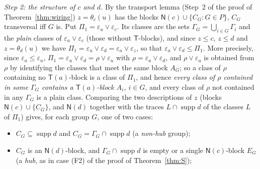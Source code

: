 \documentclass[11pt]{amsart}
\theoremstyle{definition}
\newcommand{\supp}{\operatorname{supp}}
\newcommand{\T}{\mathsf{T}}
\newcommand{\N}{\mathsf{N}}
\begin{document}
\smallskip
\emph{Step 2: the structure of $c$ and $d$.} By the transport lemma (Step~2 of the proof of Theorem~\ref{thm:wiring}) $z=\theta_c(u)$ has the blocks $\N(c)\cup\{C_G:G\in P\}$, $C_G$ transversal iff $G$ is. Put $\Pi_1=\varepsilon_u\vee\varepsilon_c$. Its classes are the sets $\Gamma_G=\bigcup_{i\in G}\Gamma_i$ and the \emph{plain} classes of $\varepsilon_a\vee\varepsilon_c$ (those without $\T$-blocks), and since $z\le c$, $z\le d$ and $z=\theta_d(u)$ we have $\Pi_1=\varepsilon_u\vee\varepsilon_d=\varepsilon_a\vee\varepsilon_z$, so that $\varepsilon_a\vee\varepsilon_d\le\Pi_1$. More precisely, since $\varepsilon_a\le\varepsilon_u$, $\Pi_1=\varepsilon_u\vee\varepsilon_d=\rho\vee\varepsilon_u$ with $\rho=\varepsilon_a\vee\varepsilon_d$, and $\rho\vee\varepsilon_u$ is obtained from $\rho$ by identifying the classes that meet the same block $A_G$; so a class of $\rho$ containing no $\T(a)$-block is a class of $\Pi_1$, and hence \emph{every class of $\rho$ contained in some $\Gamma_G$ contains a $\T(a)$-block $A_i$, $i\in G$}, and every class of $\rho$ not contained in any $\Gamma_G$ is a plain class. Comparing the two descriptions of $z$ (blocks $\N(c)\cup\{C_G\}$, and $\N(d)$ together with the traces $L\cap\supp d$ of the classes $L$ of $\Pi_1$) gives, for each group $G$, one of two cases:
\begin{itemize}[nosep]
\item[(nh)] $C_G\subseteq\supp d$ and $C_G=\Gamma_G\cap\supp d$ (a \emph{non-hub} group);
\item[(h)] $C_G$ is an $\N(d)$-block, and $\Gamma_G\cap\supp d$ is empty or a single $\N(c)$-block $E_G$ (a \emph{hub}, as in case (F2) of the proof of Theorem~\ref{thm:S});
\end{itemize}
\end{document}
